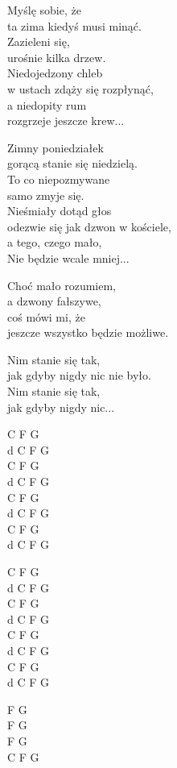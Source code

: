 \begin{text}
    Myślę sobie, że\\
    ta zima kiedyś musi minąć.\\
    Zazieleni się,\\
    urośnie kilka drzew.\\
    Niedojedzony chleb\\
    w ustach zdąży się rozpłynąć,\\
    a niedopity rum\\
    rozgrzeje jeszcze krew...

    Zimny poniedziałek\\
    gorącą stanie się niedzielą.\\
    To co niepozmywane\\
    samo zmyje się.\\
    Nieśmiały dotąd głos\\
    odezwie się jak dzwon w kościele,\\
    a tego, czego mało,\\
    Nie będzie wcale mniej...

    Choć mało rozumiem,\\
    a dzwony fałszywe,\\
    coś mówi mi, że\\
    jeszcze wszystko będzie możliwe.

    Nim stanie się tak,\\
    jak gdyby nigdy nic nie było.\\
    Nim stanie się tak,\\
    jak gdyby nigdy nic...
\end{text}
\begin{chord}
    C F G\\
    d C F G\\
    C F G\\
    d C F G\\
    C F G\\
    d C F G\\
    C F G\\
    d C F G

    C F G\\
    d C F G\\
    C F G\\
    d C F G\\
    C F G\\
    d C F G\\
    C F G\\
    d C F G

    F G\\
    F G\\
    F G\\
    C F G
\end{chord}